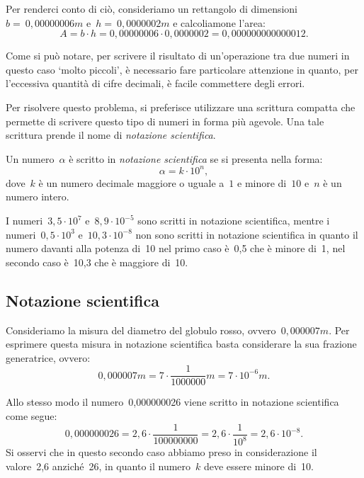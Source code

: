 Per renderci conto di ciò, consideriamo un rettangolo di dimensioni
\(b =~0,00000006\unit{m}\) e~\(h =~0,0000002\unit{m}\) e calcoliamone l'area:
\[A=b\cdot h=0,00000006\cdot0,0000002=0,000000000000012.\]

\begin{center}

\end{center}

Come si può notare, per scrivere il risultato di un'operazione tra due 
numeri 
in questo caso `molto piccoli', è necessario fare particolare attenzione in 
quanto, per l'eccessiva quantità di cifre decimali, è facile commettere 
degli 
errori.

Per risolvere questo problema, si preferisce utilizzare una scrittura 
compatta 
che permette di scrivere questo tipo di numeri in forma più agevole.
Una tale scrittura prende il nome di \emph{notazione scientifica}.

\begin{definizione}
Un numero~\(\alpha\) è scritto in \emph{notazione scientifica} se
si presenta nella forma:
\[\alpha=k\cdot10^n,\] 
dove~\(k\) è un numero decimale maggiore o uguale a~\(1\) e minore di~\(10\) 
e~\(n\) 
è un numero intero.
\end{definizione}

\begin{exrig}
 \begin{esempio}
I numeri~\(3,5\cdot10^7\) e~\(8,9\cdot10^{-5}\) sono scritti in notazione 
scientifica, mentre i numeri~\(0,5\cdot10^3\) e~\(10,3\cdot 10^{-8}\) non sono 
scritti in notazione scientifica in quanto il numero davanti alla potenza 
di~10 nel primo caso è~0,5 che è minore di~1, nel secondo caso è~10,3 che è 
maggiore di~10.
 \end{esempio}
\end{exrig}

\subsection{Notazione scientifica}
Consideriamo la misura del diametro del globulo rosso, 
ovvero~\(0,000007\unit{m}\).
Per esprimere questa misura in notazione scientifica basta considerare la 
sua 
frazione generatrice, ovvero:
\[0,000007\unit{m}=7\cdot\frac{1}{1000000}\unit{m}=7\cdot10^{-6}\unit{m}.\]

Allo stesso modo il numero~0,000000026 viene scritto in notazione 
scientifica 
come segue:
\[0,000000026=2,6\cdot\frac{1}{100000000}=2,6\cdot\frac{1}{10^8}=2,6\cdot10^
{-8}.\]
Si osservi che in questo secondo caso abbiamo preso in considerazione il 
valore~2,6 anziché~26, in quanto il numero~\(k\) deve essere minore di~10.

